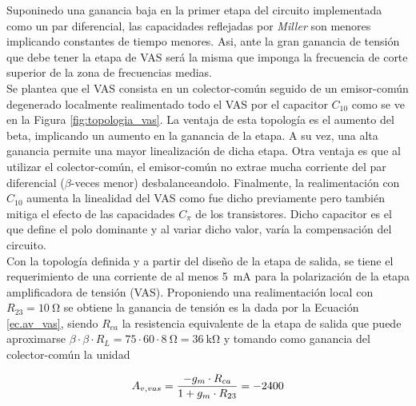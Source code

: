 	Suponinedo una ganancia baja en la primer etapa del circuito implementada como un par diferencial, las capacidades reflejadas por \emph{Miller} son menores implicando constantes de tiempo menores. Asi, ante la gran ganancia de tensión que debe tener la etapa de VAS será la misma que imponga la frecuencia de corte superior de la zona de frecuencias medias.\\
	\indent Se plantea que el VAS consista en un colector-común seguido de un emisor-común degenerado localmente realimentado todo el VAS por el capacitor $C_{10}$ como se ve en la Figura \ref{fig:topologia_vas}. La ventaja de esta topología es el aumento del beta, implicando un aumento en la ganancia de la etapa. A su vez, una alta ganancia permite una mayor linealización de dicha etapa. Otra ventaja es que al utilizar el colector-común, el emisor-común no extrae mucha corriente del par diferencial ($\beta$-veces menor) desbalanceandolo. Finalmente, la realimentación con $C_{10}$ aumenta la linealidad del VAS como fue dicho previamente pero también mitiga el efecto de las capacidades $C_{\pi}$ de los transistores. Dicho capacitor es el que define el polo dominante y al variar dicho valor, varía la compensación del circuito.\\

	Con la topología definida y a partir del diseño de la etapa de salida, se tiene el requerimiento de una corriente de al menos \SI{5}{\milli\ampere} para la polarización de la etapa amplificadora de tensión (VAS). Proponiendo una realimentación local con $R_{23} = \SI{10}{\ohm}$ se obtiene la ganancia de tensión es la dada por la Ecuación \eqref{ec.av_vas}, siendo $R_{ca}$ la resistencia equivalente de la etapa de salida que puede aproximarse $\beta \cdot \beta \cdot R_L = 75 \cdot 60 \cdot \SI{8}{\ohm} = \SI{36}{\kilo\ohm}$ y tomando como ganancia del colector-común la unidad

\begin{equation}
	\centering
	A_{v,vas} = \frac{-g_m \cdot R_{ca}}{1+g_m \cdot R_{23}} = -2400
	\label{ec.av_vas}
\end{equation}
	

